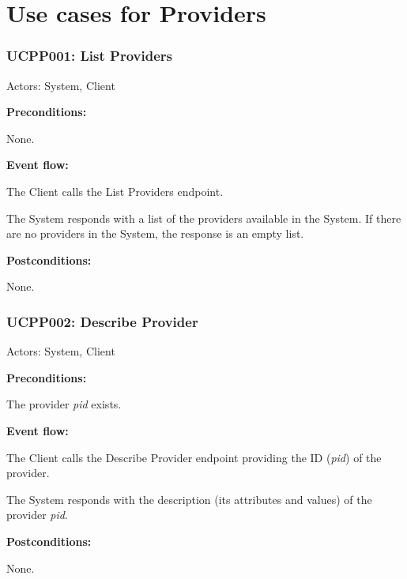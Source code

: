 \section{Use cases for Providers}

\begin{ucbox}{\subsubsection{UCPP001: List Providers}}
\label{UCPP001}

Actors: System, Client

\textbf{Preconditions:}

\ucitem None.

\textbf{Event flow:}

\ucitem The Client calls the List Providers endpoint.

\ucitem The System responds with a list of the providers available in the System. If there are no providers in the System, the response is an empty list.

\textbf{Postconditions:}

\ucitem None.

\end{ucbox}

\begin{ucbox}{\subsubsection{UCPP002: Describe Provider}}
\label{UCPP002}

Actors: System, Client

\textbf{Preconditions:}

\ucitem The provider \textit{pid} exists.

\textbf{Event flow:}

\ucitem The Client calls the Describe Provider endpoint providing the ID (\textit{pid}) of the provider.

\ucitem The System responds with the description (its attributes and values) of the provider \textit{pid}.

\textbf{Postconditions:}

\ucitem None.

\end{ucbox}

